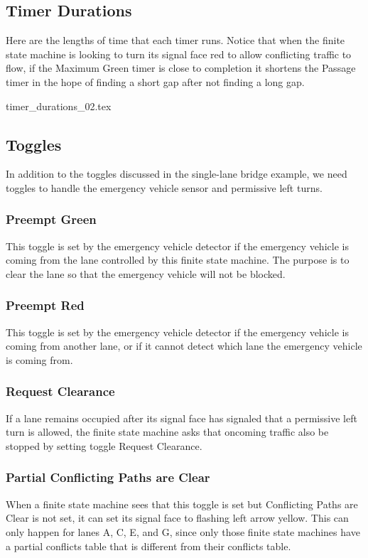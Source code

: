 \documentclass[letterpaper,twoside]{article}
\begin{document}
\subsection{Timer Durations}

Here are the lengths of time that each timer runs.
Notice that when the finite state machine is looking to turn its signal
face red to allow conflicting traffic to flow, if the Maximum Green
timer is close to completion it shortens the Passage timer in the hope
of finding a short gap after not finding a long gap.

 {timer_durations_02.tex}

\subsection{Toggles}

In addition to the toggles discussed in the single-lane bridge example,
we need toggles to handle the emergency vehicle sensor and permissive
left turns.

\subsubsection{Preempt Green}

This toggle is set by the emergency vehicle detector if the emergency
vehicle is coming from the lane controlled by this finite state machine.
The purpose is to clear the lane so that the emergency vehicle will
not be blocked.

\subsubsection{Preempt Red}

This toggle is set by the emergency vehicle detector if the emergency
vehicle is coming from another lane, or if it cannot detect
which lane the emergency vehicle is coming from.

\subsubsection{Request Clearance}
If a lane remains occupied after its signal face has signaled
that a permissive left turn is allowed, the finite state machine
asks that oncoming traffic also be stopped by setting toggle Request Clearance.

\subsubsection{Partial Conflicting Paths are Clear}
When a finite state machine  sees that this toggle is set
but Conflicting Paths are Clear is not set, it can
set its signal face to flashing left arrow yellow.
This can only happen for lanes A, C, E, and G, since only those
finite state machines have a partial conflicts table
that is different from their conflicts table.
\end{document}
